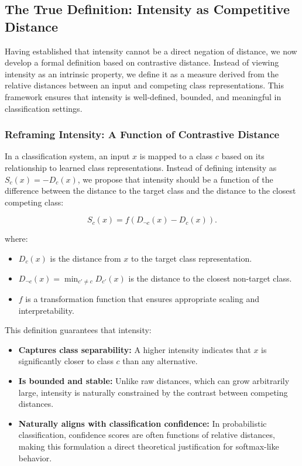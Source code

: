 \subsection{The True Definition: Intensity as Competitive Distance}

Having established that intensity cannot be a direct negation of distance, we now develop a formal definition based on contrastive distance. Instead of viewing intensity as an intrinsic property, we define it as a measure derived from the relative distances between an input and competing class representations. This framework ensures that intensity is well-defined, bounded, and meaningful in classification settings.

\subsubsection{Reframing Intensity: A Function of Contrastive Distance}

In a classification system, an input \( x \) is mapped to a class \( c \) based on its relationship to learned class representations. Instead of defining intensity as \( S_c(x) = -D_c(x) \), we propose that intensity should be a function of the difference between the distance to the target class and the distance to the closest competing class:

\[
S_c(x) = f(D_{\neg c}(x) - D_c(x)).
\]

where:

\begin{itemize}
    \item \( D_c(x) \) is the distance from \( x \) to the target class representation.
    \item \( D_{\neg c}(x) = \min_{c' \neq c} D_{c'}(x) \) is the distance to the closest non-target class.
    \item \( f \) is a transformation function that ensures appropriate scaling and interpretability.
\end{itemize}


This definition guarantees that intensity:

\begin{itemize}
    \item \textbf{Captures class separability:} A higher intensity indicates that \( x \) is significantly closer to class \( c \) than any alternative.
    \item \textbf{Is bounded and stable:} Unlike raw distances, which can grow arbitrarily large, intensity is naturally constrained by the contrast between competing distances.
    \item \textbf{Naturally aligns with classification confidence:} In probabilistic classification, confidence scores are often functions of relative distances, making this formulation a direct theoretical justification for softmax-like behavior.
\end{itemize}

